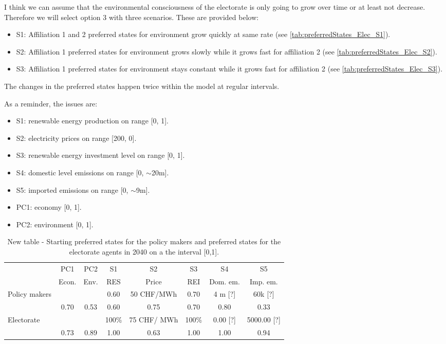 \documentclass[12pt]{article}
\begin{document}
I think we can assume that the environmental consciousness of the electorate is only going to grow over time or at least not decrease. Therefore we will select option 3 with three scenarios. These are provided below:

\begin{itemize}
\item S1: Affiliation 1 and 2 preferred states for environment grow quickly at same rate (see \autoref{tab:preferredStates_Elec_S1}).
\item S2: Affiliation 1 preferred states for environment grows slowly while it grows fast for affiliation 2 (see \autoref{tab:preferredStates_Elec_S2}).
\item S3: Affiliation 1 preferred states for environment stays constant while it grows fast for affiliation 2 (see \autoref{tab:preferredStates_Elec_S3}).
\end{itemize}

The changes in the preferred states happen twice within the model at regular intervals.

As a reminder, the issues are: 

\begin{itemize}
\item S1: renewable energy production on range [0, 1].
\item S2: electricity prices on range [200, 0]. %
\item S3: renewable energy investment level on range [0, 1].
\item S4: domestic level emissions on range [0, $\sim$20m].
\item S5: imported emissions on range [0, $\sim$9m]. %
\item PC1: economy [0, 1]. %
\item PC2: environment [0, 1]. %
\end{itemize}

\begin{table}
\begin{center}
\begin{tabular}{|l|c|c|c|c|c|c|c|} 
\hline
		& PC1		& PC2	&  S1	& S2			& S3		& S4			& S5			\\ 
		& Econ.		& Env.	& RES	& Price		& REI	& Dom. em.	& Imp. em.	\\ \hline
\multirow{2}{*}{Policy makers}
		& 			&		& 0.60	& 50 CHF/MWh	& 0.70	& 4 m [?]		& 60k [?]		\\ \cline{2-8}
		& 0.70		& 0.53	& 0.60	& 0.75		& 0.70	& 0.80		& 0.33		\\ \hline
\multirow{2}{*}{Electorate}
		&			&		&100\%	& 75 CHF/	MWh	& 100\%	& 0.00 [?]		& 5000.00	 [?]	\\ \cline{2-8}
		& 0.73		& 0.89	&1.00	& 0.63		& 1.00	& 1.00		& 0.94	 	\\ \hline
\end{tabular}
\end{center}
\caption{New table - Starting preferred states for the policy makers and preferred states for the electorate agents in 2040 on a the interval [0,1].}
\label{tab:}
\end{table}
\end{document}
